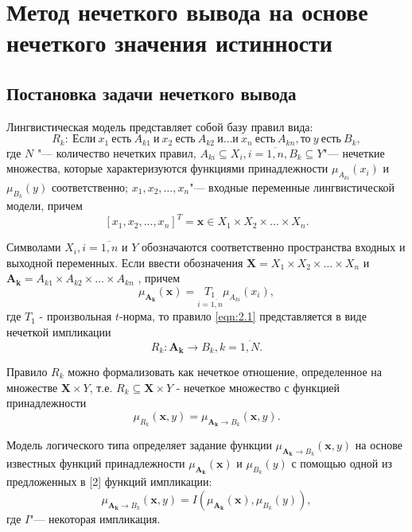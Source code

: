 \chapter{Метод нечеткого вывода на основе нечеткого значения истинности}\label{ch:ch2}

\section{Постановка задачи нечеткого вывода}

Лингвистическая модель представляет собой базу правил вида:
\begin{equation}
\label{eqn:fuz-problem-1}
R_k:\ \text{Если}\ x_1\ \text{есть}\ A_{k1}\ \text{и}\ x_2\ \text{есть}\ A_{k2}\ \text{и} \dots \text{и}\ x_n\ \text{есть}\ A_{kn}, \text{то}\ y\ \text{есть}\ B_k,
\end{equation}
где $N$ "--- количество нечетких правил, $A_{ki} \subseteq X_i, i=\overline{1,n}, B_k \subseteq Y$"--- нечеткие множества, которые характеризуются функциями принадлежности $\mu_{A_{ki}}(x_i)$ и $\mu_{B_k}(y)$ соответственно; $x_1, x_2,…,x_n$"--- входные переменные лингвистической модели, причем
\[
[x_1, x_2, ..., x_n]^T = \mathbf{x} \in X_1 \times X_2 \times \dots \times X_n.
\]

Символами  $X_i, i=\overline{1,n}$ и $Y$ обозначаются соответственно пространства входных и выходной переменных. Если ввести обозначения $\mathbf{X}=X_1 \times X_2 \times \dots \times X_n$ и $\mathbf{A_k}=A_{k1}\times A_{k2} \times \dots \times A_{kn}$ , причем
\[
\mu_\mathbf{A_k}(\mathbf{x}) = \underset{i=\overline{1,n}}{T_1} \mu_{A_{ki}}(x_i),
\]
где $T_1$ - произвольная $t$-норма, то правило \ref{eqn:2.1} представляется в виде нечеткой импликации
\begin{equation}
\label{eqn:fuz-problem-2}
R_k: \mathbf{A_k} \to B_k, k=\overline{1,N}.
\end{equation}

Правило $R_k$ можно формализовать как нечеткое отношение, определенное на множестве  $\mathbf{X}\times Y$, т.е. $R_k \subseteq \mathbf{X} \times Y$ - нечеткое множество с функцией принадлежности
\[
\mu_{R_k}(\mathbf{x}, y) = \mu_{\mathbf{A_k} \to B_k} (\mathbf{x}, y).
\]

Модель логического типа определяет задание функции $\mu_{\mathbf{A_k} \to B_k} (\mathbf{x}, y)$ на основе известных функций принадлежности $\mu_{\mathbf{A_k}}(\mathbf{x})$ и $\mu_{B_k}(y)$ с помощью одной из предложенных в [2] функций импликации:
\[
\mu_{\mathbf{A_k} \to B_k} (\mathbf{x}, y) = I(\mu_{\mathbf{A_k}}(\mathbf{x}), \mu_{B_k}(y)),
\]
где $I$"--- некоторая импликация.

